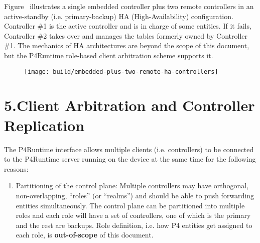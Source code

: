 \documentclass[11pt]{article}
\begin{document}
{%
\noindent{}Figure~ illustrates a single
embedded controller plus two remote controllers in an active-standby (i.e.
primary-backup) HA (High-Availability) configuration. Controller \#1 is the
active controller and is in charge of some entities. If it fails, Controller \#2
takes over and manages the tables formerly owned by Controller \#1. The mechanics
of HA architectures are beyond the scope of this document, but the P4Runtime
role-based client arbitration scheme supports it.%

\begin{figure}[tbp]%
\begin{mdcenter}%

\noindent{}\texttt{[image: build/embedded-plus-two-remote-ha-controllers]}{}%

\mdhr{}%

\noindent{}%
\end{mdcenter}\label{fig-embedded-plus-two-remote-ha-controllers}%
\end{figure}%

\section{5.\hspace*{0.5em}Client Arbitration and Controller Replication}\label{sec-client-arbitration-and-controller-replication}%

\noindent{}The P4Runtime interface allows multiple clients (i.e. controllers) to be
connected to the P4Runtime server running on the device at the same time for the
following reasons:%

\begin{enumerate}%

\item{}
Partitioning of the control plane: Multiple controllers may have orthogonal,
non-overlapping, \textquotedblleft{}roles\textquotedblright{} (or \textquotedblleft{}realms\textquotedblright{}) and should be able to push forwarding
entities simultaneously. The control plane can be partitioned into multiple
roles and each role will have a set of controllers, one of which is the
primary and the rest are backups. Role definition, i.e. how P4 entities get
assigned to each role, is \textbf{out-of-scope} of this document.%


\end{enumerate}}
\end{document}
